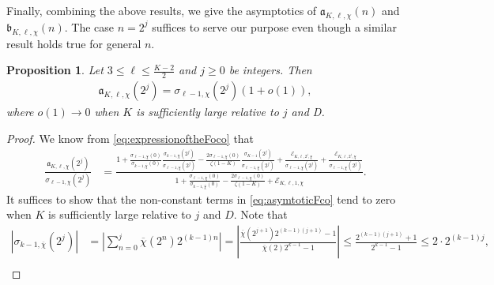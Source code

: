 \documentclass[11pt,letterpaper,reqno]{amsart}
\numberwithin{figure}{section}
\numberwithin{table}{section}
\theoremstyle{definition}
\theoremstyle{plain}
\newtheorem{proposition}[theorem]{Proposition}
\theoremstyle{definition}
\theoremstyle{definition}
\theoremstyle{remark}
\numberwithin{equation}{section}
\theoremstyle{remark}
\begin{document}
Finally, combining the above results,  we give the asymptotics of $\mathfrak{a}_{K,\ell,\chi}(n)$ and $\mathfrak{b}_{K,\ell,\chi}(n)$.  The case $n=2^j$ suffices to serve our purpose even though a similar result holds true for general $n$. 
\begin{proposition}\label{prop:asymptoticA}
    Let $3\leq\ell\leq\frac{K-2}{2}$ and $j\geq0$  be integers. Then 
    \begin{align*}
        \mathfrak{a}_{K,\ell,\chi}(2^j)=\sigma_{\ell-1,\chi}(2^{j})(1+o(1)),
    \end{align*}
    where $o(1)\rightarrow 0$ when $K$ is sufficiently large relative to $j$ and D.
\end{proposition}
\begin{proof}
We know from \eqref{eq:expressionoftheFoco}  that
\begin{align}
     \frac{\mathfrak{a}_{K,\ell,\chi}(2^j)}{\sigma_{\ell-1,\chi}(2^j)}&=\frac{1+\frac{\sigma_{\ell-1,\chi}(0)}{\sigma_{k-1,\overline{\chi}}(0)}\frac{\sigma_{k-1,\overline{\chi}}(2^j)}{\sigma_{\ell-1,\chi}(2^j)}-\frac{2\sigma_{\ell-1,\chi}(0)}{\zeta(1-K) }\frac{\sigma_{K-1}(2^j)}{\sigma_{\ell-1,\chi}(2^j)}+\frac{\mathcal{E}_{K,\ell,2^j,\chi}}{\sigma_{\ell-1,\chi}(2^j)}+\frac{\mathscr{E}_{K,\ell,2^j,\chi}}{\sigma_{\ell-1,\chi}(2^j)}}{1+\frac{\sigma_{\ell-1,\chi}(0)}{\sigma_{k-1,\overline{\chi}}(0)}-\frac{2\sigma_{\ell-1,\chi}(0)}{\zeta(1-K) }+\mathscr{E}_{K,\ell,1,\chi}}.\label{eq:asymtoticFco}
\end{align}
It suffices to show that the non-constant terms in \eqref{eq:asymtoticFco} tend to zero when $K$ is sufficiently large relative to $j$ and $D$.
Note that
\begin{align}
    |\sigma_{k-1,\overline{\chi}}(2^j)|&=\left|\sum_{n=0}^j\overline{\chi}(2^n)2^{(k-1)n}\right|=\left|\frac{\overline{\chi}(2^{j+1})2^{(k-1)(j+1)}-1}{\overline{\chi}(2)2^{k-1}-1}\right|\leq\frac{2^{(k-1)(j+1)}+1}{2^{k-1}-1}\leq2\cdot 2^{(k-1)j},  \nonumber\\

\end{align}
\end{proof}
\end{document}

